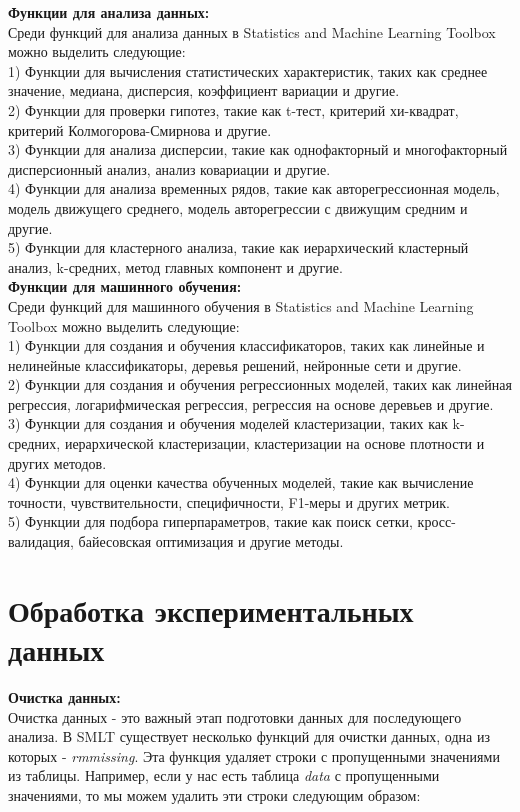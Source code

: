 \documentclass[a4paper, 12pt]{article}%
\begin{document}
\begin{titlepage}
	\textbf{Функции для анализа данных:}\\
	Среди функций для анализа данных в Statistics and Machine Learning Toolbox можно выделить следующие:\\
	1) Функции для вычисления статистических характеристик, таких как среднее значение, медиана, дисперсия, коэффициент вариации и другие.\\
	2) Функции для проверки гипотез, такие как t-тест, критерий хи-квадрат, критерий Колмогорова-Смирнова и другие.\\
	3) Функции для анализа дисперсии, такие как однофакторный и многофакторный дисперсионный анализ, анализ ковариации и другие.\\
	4) Функции для анализа временных рядов, такие как авторегрессионная модель, модель движущего среднего, модель авторегрессии с движущим средним и другие.\\
	5) Функции для кластерного анализа, такие как иерархический кластерный анализ, k-средних, метод главных компонент и другие.\\
	
	\textbf{Функции для машинного обучения:}\\
	Среди функций для машинного обучения в Statistics and Machine Learning Toolbox можно выделить следующие:\\
	1) Функции для создания и обучения классификаторов, таких как линейные и нелинейные классификаторы, деревья решений, нейронные сети и другие.\\
	2) Функции для создания и обучения регрессионных моделей, таких как линейная регрессия, логарифмическая регрессия, регрессия на основе деревьев и другие.\\
	3) Функции для создания и обучения моделей кластеризации, таких как k-средних, иерархической кластеризации, кластеризации на основе плотности и других методов.\\
	4) Функции для оценки качества обученных моделей, такие как вычисление точности, чувствительности, специфичности, F1-меры и других метрик.\\
	5) Функции для подбора гиперпараметров, такие как поиск сетки, кросс-валидация, байесовская оптимизация и другие методы.\\
	
	\section{Обработка экспериментальных данных}

	\hspace{\parindent} \textbf{Очистка данных:}\\
		Очистка данных - это важный этап подготовки данных для последующего анализа. В SMLT существует несколько функций для очистки данных, одна из которых - \textit{rmmissing}. Эта функция удаляет строки с пропущенными значениями из таблицы. Например, если у нас есть таблица \textit{data} с пропущенными значениями, то мы можем удалить эти строки следующим образом:\\
		

\end{titlepage}
\end{document}
